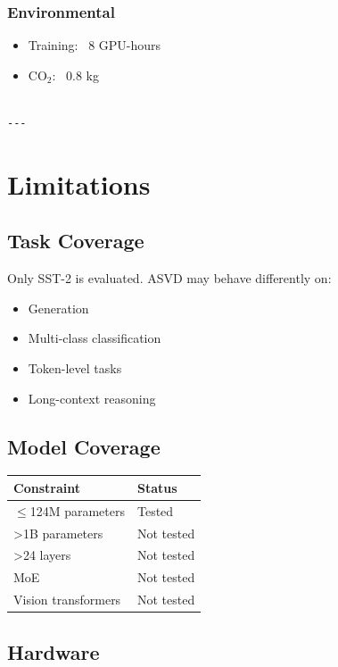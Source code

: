 \subsubsection{Environmental}
\begin{itemize}
\item Training: ~8 GPU-hours
\item CO$_2$: ~0.8 kg
\end{itemize}
\begin{lstlisting}

---
\end{lstlisting}


\section{Limitations}

\subsection{Task Coverage}

Only SST-2 is evaluated. ASVD may behave differently on:
\begin{itemize}
\item Generation
\item Multi-class classification
\item Token-level tasks
\item Long-context reasoning

\end{itemize}
\subsection{Model Coverage}

\begin{table}[H]
\centering
\small
\begin{tabular}{ll}
\toprule
\textbf{Constraint} & \textbf{Status} \\
\midrule
$\le$124M parameters & Tested \\
>1B parameters & Not tested \\
>24 layers & Not tested \\
MoE & Not tested \\
Vision transformers & Not tested \\
\bottomrule
\end{tabular}
\end{table}

\subsection{Hardware}

